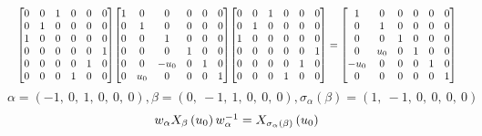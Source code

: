 \documentclass[11pt]{article}
\theoremstyle{definition}
\begin{document}
\[
\scaletoalign{\textwidth}{{\left[\begin{matrix}0 & 0 & 1 & 0 & 0 & 0\\0 & 1 & 0 & 0 & 0 & 0\\1 & 0 & 0 & 0 & 0 & 0\\0 & 0 & 0 & 0 & 0 & 1\\0 & 0 & 0 & 0 & 1 & 0\\0 & 0 & 0 & 1 & 0 & 0\end{matrix}\right]} {\left[\begin{matrix}1 & 0 & 0 & 0 & 0 & 0\\0 & 1 & 0 & 0 & 0 & 0\\0 & 0 & 1 & 0 & 0 & 0\\0 & 0 & 0 & 1 & 0 & 0\\0 & 0 & - u_{0} & 0 & 1 & 0\\0 & u_{0} & 0 & 0 & 0 & 1\end{matrix}\right]} {\left[\begin{matrix}0 & 0 & 1 & 0 & 0 & 0\\0 & 1 & 0 & 0 & 0 & 0\\1 & 0 & 0 & 0 & 0 & 0\\0 & 0 & 0 & 0 & 0 & 1\\0 & 0 & 0 & 0 & 1 & 0\\0 & 0 & 0 & 1 & 0 & 0\end{matrix}\right]} = {\left[\begin{matrix}1 & 0 & 0 & 0 & 0 & 0\\0 & 1 & 0 & 0 & 0 & 0\\0 & 0 & 1 & 0 & 0 & 0\\0 & u_{0} & 0 & 1 & 0 & 0\\- u_{0} & 0 & 0 & 0 & 1 & 0\\0 & 0 & 0 & 0 & 0 & 1\end{matrix}\right]}}
\]
\[
\alpha = \left( -1, \  0, \  1, \  0, \  0, \  0\right), \beta = \left( 0, \  -1, \  1, \  0, \  0, \  0\right), \sigma_{\alpha}(\beta) = \left( 1, \  -1, \  0, \  0, \  0, \  0\right)
\]
\[
\scaletoalign{\textwidth}{w_{\alpha} X_{\beta}\left(u_{0}\right) w_{\alpha}^{-1} = X_{\sigma_{\alpha}\left(\beta\right)}\left(u_{0}\right)}
\]
\end{document}
